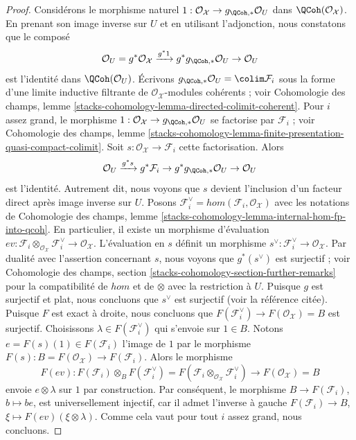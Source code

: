 \begin{proof}
Considérons le morphisme naturel
$1 : \mathcal{O}_\mathcal{X} \to g_{\QCoh, *}\mathcal{O}_U$
dans $\QCoh(\mathcal{O}_\mathcal{X})$. En prenant son image inverse sur $U$ et
en utilisant l'adjonction, nous constatons que le composé
$$
\mathcal{O}_U =
g^*\mathcal{O}_\mathcal{X} \xrightarrow{g^*1}
g^*g_{\QCoh, *}\mathcal{O}_U \to \mathcal{O}_U
$$
est l'identité dans $\QCoh(\mathcal{O}_U)$.
Écrivons $g_{\QCoh, *}\mathcal{O}_U = \colim \mathcal{F}_i$
sous la forme d'une limite inductive filtrante de $\mathcal{O}_\mathcal{X}$-modules cohérents ; voir
Cohomologie des champs, lemme
\ref{stacks-cohomology-lemma-directed-colimit-coherent}.
Pour $i$ assez grand, le morphisme
$1 : \mathcal{O}_\mathcal{X} \to g_{\QCoh, *}\mathcal{O}_U$
se factorise par $\mathcal{F}_i$ ; voir
Cohomologie des champs, lemme
\ref{stacks-cohomology-lemma-finite-presentation-quasi-compact-colimit}.
Soit $s : \mathcal{O}_\mathcal{X} \to \mathcal{F}_i$ cette
factorisation. Alors
$$
\mathcal{O}_U \xrightarrow{g^*s} g^*\mathcal{F}_i \to
g^*g_{\QCoh, *}\mathcal{O}_U \to \mathcal{O}_U
$$
est l'identité. Autrement dit, nous voyons que $s$ devient
l'inclusion d'un facteur direct après image inverse sur $U$. Posons
$\mathcal{F}_i^\vee = hom(\mathcal{F}_i, \mathcal{O}_\mathcal{X})$
avec les notations de
Cohomologie des champs, lemme
\ref{stacks-cohomology-lemma-internal-hom-fp-into-qcoh}.
En particulier, il existe un morphisme d'évaluation
$ev : \mathcal{F}_i \otimes_{\mathcal{O}_\mathcal{X}} \mathcal{F}_i^\vee
\to \mathcal{O}_\mathcal{X}$.
L'évaluation en $s$ définit un morphisme
$s^\vee : \mathcal{F}_i^\vee \to \mathcal{O}_\mathcal{X}$.
Par dualité avec l'assertion concernant $s$, nous voyons que $g^*(s^\vee)$ est surjectif ;
voir Cohomologie des champs, section
\ref{stacks-cohomology-section-further-remarks}
pour la compatibilité de $hom$ et de $\otimes$ avec la restriction à $U$.
Puisque $g$ est surjectif et plat, nous concluons que $s^\vee$ est surjectif
(voir la référence citée). Puisque $F$ est exact à droite, nous concluons que
$F(\mathcal{F}_i^\vee) \to F(\mathcal{O}_\mathcal{X}) = B$ est surjectif.
Choisissons $\lambda \in F(\mathcal{F}_i^\vee)$
qui s'envoie sur $1 \in B$. Notons $e = F(s)(1) \in F(\mathcal{F}_i)$
l'image de $1$ par le morphisme
$F(s) : B = F(\mathcal{O}_\mathcal{X}) \to F(\mathcal{F}_i)$.
Alors le morphisme
$$
F(ev) :
F(\mathcal{F}_i) \otimes_B F(\mathcal{F}_i^\vee) =
F(\mathcal{F}_i \otimes_{\mathcal{O}_\mathcal{X}} \mathcal{F}_i^\vee)
\longrightarrow
F(\mathcal{O}_\mathcal{X}) = B
$$
envoie $e \otimes \lambda$ sur $1$ par construction. Par conséquent, le
morphisme $B \to F(\mathcal{F}_i)$, $b \mapsto be$,
est universellement injectif, car il admet l'inverse à gauche
$F(\mathcal{F}_i) \to B$, $\xi \mapsto F(ev)(\xi \otimes \lambda)$.
Comme cela vaut pour tout $i$ assez grand, nous concluons.
\end{proof}

